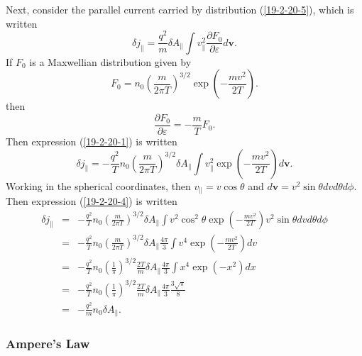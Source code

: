 \documentclass{llncs}
\begin{document}
Next, consider the parallel current carried by distribution (\ref{19-2-20-5}),
which is written
\begin{equation}
  \label{19-2-20-1} \delta j_{\parallel} = \frac{q^2}{m} \delta A_{\parallel}
  \int v_{\parallel}^2 \frac{\partial F_0}{\partial \varepsilon} d\mathbf{v}.
\end{equation}
If $F_0$ is a Maxwellian distribution given by
\begin{equation}
  F_0 = n_0 \left( \frac{m}{2 \pi T} \right)^{3 / 2} \exp \left( - \frac{m
  v^2}{2 T} \right) .
\end{equation}
then
\begin{equation}
  \frac{\partial F_0}{\partial \varepsilon} = - \frac{m}{T} F_0 .
\end{equation}
Then expression (\ref{19-2-20-1}) is written
\begin{equation}
  \label{19-2-20-4} \delta j_{\parallel} = - \frac{q^2}{T} n_0 \left(
  \frac{m}{2 \pi T} \right)^{3 / 2} \delta A_{\parallel} \int v_{\parallel}^2
  \exp \left( - \frac{m v^2}{2 T} \right) d\mathbf{v}.
\end{equation}
Working in the spherical coordinates, then $v_{\parallel} = v \cos \theta$ and
$d\mathbf{v}= v^2 \sin \theta d v d \theta d \phi$. Then expression
(\ref{19-2-20-4}) is written
\begin{eqnarray}
  \delta j_{\parallel} & = & - \frac{q^2}{T} n_0 \left( \frac{m}{2 \pi T}
  \right)^{3 / 2} \delta A_{\parallel} \int v^2 \cos^2 \theta \exp \left( -
  \frac{m v^2}{2 T} \right) v^2 \sin \theta d v d \theta d \phi \nonumber\\
  & = & - \frac{q^2}{T} n_0 \left( \frac{m}{2 \pi T} \right)^{3 / 2} \delta
  A_{\parallel} \frac{4 \pi}{3} \int v^4 \exp \left( - \frac{m v^2}{2 T}
  \right) d v \\
  & = & - \frac{q^2}{T} n_0 \left( \frac{1}{\pi} \right)^{3 / 2} \frac{2
  T}{m} \delta A_{\parallel} \frac{4 \pi}{3} \int x^4 \exp (- x^2) d x
  \nonumber\\
  & = & - \frac{q^2}{T} n_0 \left( \frac{1}{\pi} \right)^{3 / 2} \frac{2
  T}{m} \delta A_{\parallel} \frac{4 \pi}{3} \frac{3 \sqrt{\pi}}{8}
  \nonumber\\
  & = & - \frac{q^2}{m} n_0 \delta A_{\parallel} . 
\end{eqnarray}

\subsubsection{Ampere's Law}
\end{document}
